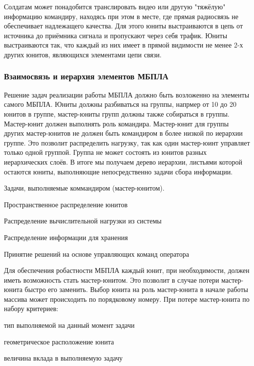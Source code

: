 Солдатам может понадобится транслировать видео или другую
"тяжёлую" информацию командиру, находясь при этом в месте,
где прямая радиосвязь не обеспечивает надлежащего качества.
Для этого юниты выстраиваются в цепь от источника до приёмника
сигнала и пропускают через себя трафик. Юниты выстраиваются так,
что каждый из них имеет в прямой видимости не менее 2-х других
юнитов, являющихся элементами цепи связи.

\subsubsection{Взаимосвязь и иерархия элементов МБПЛА}

Решение задач реализации работы МБПЛА должно быть возложенно на элементы
самого МБПЛА. Юниты должны разбиваться на группы, напрмер
от 10 до 20 юнитов в группе, мастер-юниты групп должны также собираться
в группы. Мастер-юнит должен выполнять роль командира. Мастер-юнит для
группы других мастер-юнитов не должен быть командиром в более низкой по
иерархии группе. Это позволит распределить нагрузку, так как один мастер-юинт
управляет только одной группой. Группа не может состоять из юнитов разных
иерархических слоёв. В итоге мы получаем дерево иерархии, листьями которой
остаются юниты, выполняющие непосредственно задачи сбора информации.

Задачи, выполняемые коммандиром (мастер-юнитом).

\begin{mintemize}
\item Пространственное распределение юнитов
\item Распределение вычислительной нагрузки из системы
\item Распределение информации для хранения
\item Принятие решений на основе управляющих команд оператора
\end{mintemize}

Для обеспечения робастности МБПЛА каждый юнит, при необходимости, должен
иметь возможность стать мастер-юнитом. Это позволит в случае потери
мастер-юнита быстро его заменить. Выбор юнита на роль мастер-юнита в начале
работы массива может происходить по порядковому номеру. При потере
мастер-юнита по набору критериев:

\begin{mintemize}
\item тип выполняемой на данный момент задачи
\item геометрическое расположение юнита
\item величина вклада в выполняемую задачу
\end{mintemize}

